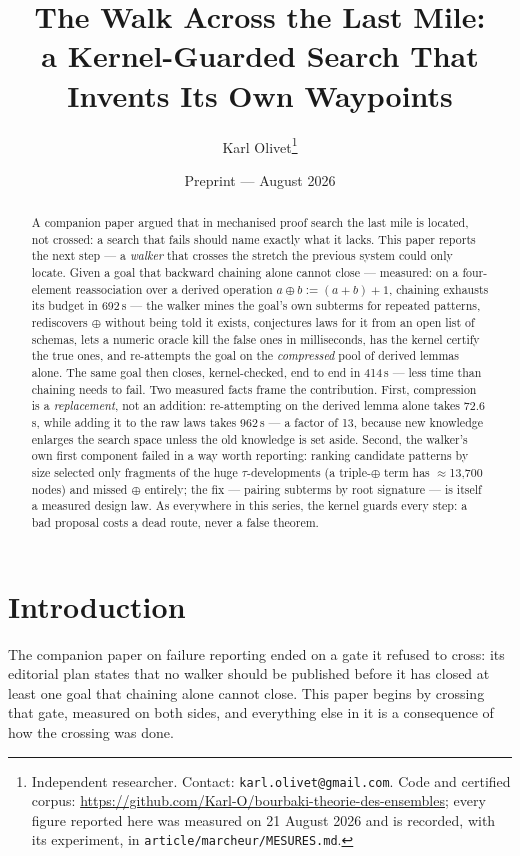 \documentclass[11pt]{article}
\title{The Walk Across the Last Mile:\\
a Kernel-Guarded Search That Invents Its Own Waypoints}
\author{Karl Olivet\thanks{Independent researcher. Contact:
\texttt{karl.olivet@gmail.com}. Code and certified corpus:
\url{https://github.com/Karl-O/bourbaki-theorie-des-ensembles}; every figure
reported here was measured on 21 August 2026 and is recorded, with its
experiment, in \texttt{article/marcheur/MESURES.md}.}}
\date{Preprint --- August 2026}
\theoremstyle{remark}\newtheorem{remark}{Remark}
\begin{document}
\maketitle

\begin{abstract}
A companion paper argued that in mechanised proof search the last mile is
located, not crossed: a search that fails should name exactly what it lacks.
This paper reports the next step --- a \emph{walker} that crosses the stretch
the previous system could only locate. Given a goal that backward chaining
alone cannot close --- measured: on a four-element reassociation over a derived
operation $a \oplus b := (a+b)+1$, chaining exhausts its budget in 692\,s ---
the walker mines the goal's own subterms for repeated patterns, rediscovers
$\oplus$ without being told it exists, conjectures laws for it from an open
list of schemas, lets a numeric oracle kill the false ones in milliseconds,
has the kernel certify the true ones, and re-attempts the goal on the
\emph{compressed} pool of derived lemmas alone. The same goal then closes,
kernel-checked, end to end in 414\,s --- less time than chaining needs to
fail. Two measured facts frame the contribution.
First, compression is a \emph{replacement}, not an addition: re-attempting on
the derived lemma alone takes 72.6\,s, while adding it to the raw laws takes
962\,s --- a factor of 13, because new knowledge enlarges the search space
unless the old knowledge is set aside. Second, the walker's own first
component failed in a way worth reporting: ranking candidate patterns by size
selected only fragments of the huge $\tau$-developments (a triple-$\oplus$
term has $\approx$13{,}700 nodes) and missed $\oplus$ entirely; the fix ---
pairing subterms by root signature --- is itself a measured design law. As
everywhere in this series, the kernel guards every step: a bad proposal costs
a dead route, never a false theorem.
\end{abstract}

\section{Introduction}
\label{sec:intro}

The companion paper on failure reporting ended on a gate it refused to cross:
its editorial plan states that no walker should be published before it has
closed at least one goal that chaining alone cannot close. This paper begins
by crossing that gate, measured on both sides, and everything else in it is a
consequence of how the crossing was done.
\end{document}
